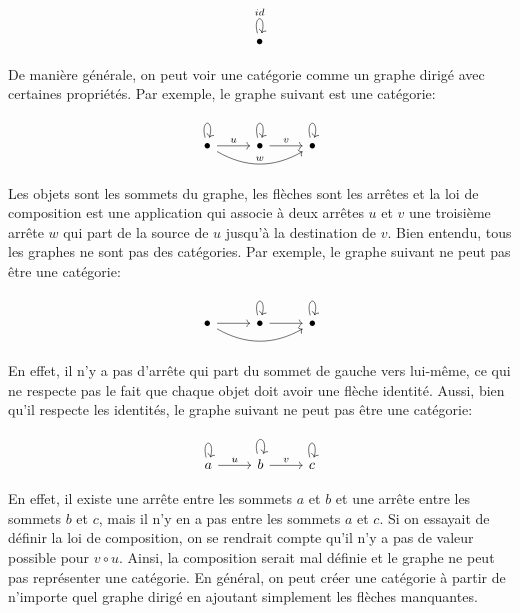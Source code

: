 \[
\scalebox{1}{
    \begin{tikzcd}
        \bullet \arrow[loop above, "id"]
    \end{tikzcd}
}
\]

De manière générale, on peut voir une catégorie comme un graphe dirigé avec
certaines propriétés. Par exemple, le graphe suivant est une catégorie:

\[
\begin{tikzcd}
        \bullet \arrow[loop above] \arrow[r, "u"] \arrow[rr, bend right, "w"]
      & \bullet \arrow[loop above] \arrow[r, "v"]
      & \bullet \arrow[loop above]
\end{tikzcd}
\]

Les objets sont les sommets du graphe, les flèches sont les arrêtes et la loi
de composition est une application qui associe à deux arrêtes $u$ et $v$ une
troisième arrête $w$ qui part de la source de $u$ jusqu'à la destination de
$v$. Bien entendu, tous les graphes ne sont pas des catégories. Par exemple,
le graphe suivant ne peut pas être une catégorie:

\[
\begin{tikzcd}
        \bullet \arrow[r] \arrow[rr, bend right]
      & \bullet \arrow[loop above] \arrow[r]
      & \bullet \arrow[loop above]
\end{tikzcd}
\]

En effet, il n'y a pas d'arrête qui part du sommet de gauche vers lui-même, ce
qui ne respecte pas le fait que chaque objet doit avoir une flèche identité.
Aussi, bien qu'il respecte les identités, le graphe suivant ne peut pas être
une catégorie:

\[
\begin{tikzcd}
        a \arrow[loop above] \arrow[r, "u"]
      & b \arrow[loop above] \arrow[r, "v"]
      & c \arrow[loop above]
\end{tikzcd}
\]

En effet, il existe une arrête entre les sommets $a$ et $b$ et une arrête
entre les sommets $b$ et $c$, mais il n'y en a pas entre les sommets $a$ et
$c$. Si on essayait de définir la loi de composition, on se rendrait compte
qu'il n'y a pas de valeur possible pour $v \circ u$. Ainsi, la composition
serait mal définie et le graphe ne peut pas représenter une catégorie. En
général, on peut créer une catégorie à partir de n'importe quel graphe dirigé
en ajoutant simplement les flèches manquantes.

